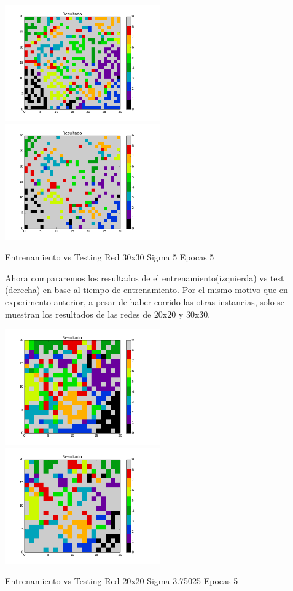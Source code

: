 \includegraphics[width=0.5\textwidth]{img/EJ2_Sigma/train_M_30_sigma_5_0_epocas_5}
\includegraphics[width=0.5\textwidth]{img/EJ2_Sigma/test_M_30_sigma_5_0_epocas_5}
{\center \footnotesize Entrenamiento vs Testing Red 30x30 Sigma 5 Epocas 5\par}

Ahora compararemos los resultados de el entrenamiento(izquierda) vs test (derecha) en base al tiempo de entrenamiento. Por el mismo motivo que en experimento anterior, a pesar de haber corrido las otras instancias, solo se muestran los resultados de las redes de 20x20 y 30x30.

\includegraphics[width=0.5\textwidth]{img/Ej2_Epocas/train_M_20_sigma_3_75025_epocas_5}
\includegraphics[width=0.5\textwidth]{img/Ej2_Epocas/test_M_20_sigma_3_75025_epocas_5}
{\center \footnotesize Entrenamiento vs Testing Red 20x20 Sigma 3.75025 Epocas 5\par}

